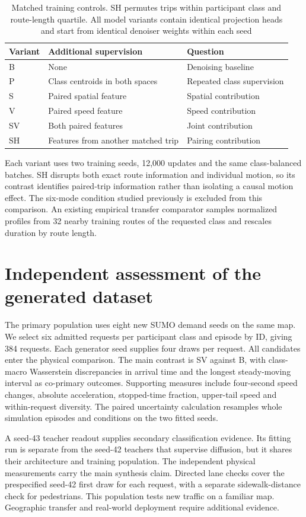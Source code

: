 \begin{table}[htbp]
\centering\small
\begin{tabular}{lll}
\toprule
Variant & Additional supervision & Question\\
\midrule
B & None & Denoising baseline\\
P & Class centroids in both spaces & Repeated class supervision\\
S & Paired spatial feature & Spatial contribution\\
V & Paired speed feature & Speed contribution\\
SV & Both paired features & Joint contribution\\
SH & Features from another matched trip & Pairing contribution\\
\bottomrule
\end{tabular}
\caption{Matched training controls. SH permutes trips within participant class and route-length quartile. All model variants contain identical projection heads and start from identical denoiser weights within each seed}
\end{table}

Each variant uses two training seeds, 12,000 updates and the same class-balanced batches. SH disrupts both exact route information and individual motion, so its contrast identifies paired-trip information rather than isolating a causal motion effect. The six-mode condition studied previously is excluded from this comparison. An existing empirical transfer comparator samples normalized profiles from 32 nearby training routes of the requested class and rescales duration by route length.

\section{Independent assessment of the generated dataset}
The primary population uses eight new SUMO demand seeds on the same map. We select six admitted requests per participant class and episode by ID, giving 384 requests. Each generator seed supplies four draws per request. All candidates enter the physical comparison. The main contrast is SV against B, with class-macro Wasserstein discrepancies in arrival time and the longest steady-moving interval as co-primary outcomes. Supporting measures include four-second speed changes, absolute acceleration, stopped-time fraction, upper-tail speed and within-request diversity. The paired uncertainty calculation resamples whole simulation episodes and conditions on the two fitted seeds.

A seed-43 teacher readout supplies secondary classification evidence. Its fitting run is separate from the seed-42 teachers that supervise diffusion, but it shares their architecture and training population. The independent physical measurements carry the main synthesis claim. Directed lane checks cover the prespecified seed-42 first draw for each request, with a separate sidewalk-distance check for pedestrians. This population tests new traffic on a familiar map. Geographic transfer and real-world deployment require additional evidence.


